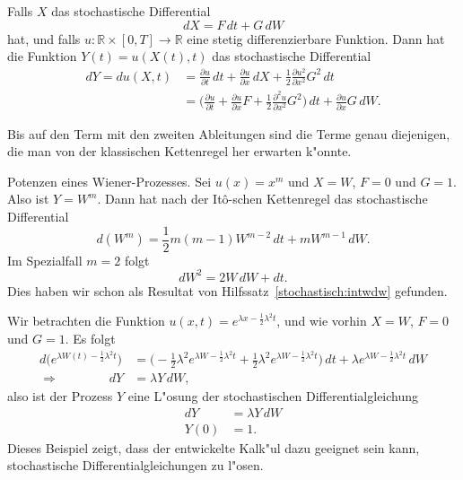\begin{satz}[It\^o's Kettenregel]
Falls $X$ das stochastische Differential
\[
dX=F\,dt + G\,dW
\]
hat, und falls $u\colon \mathbb R\times [0,T]\to\mathbb R$ eine
stetig differenzierbare Funktion.
Dann hat die Funktion $Y(t)=u(X(t), t)$ das stochastische Differential
\begin{align*}
dY
=
du(X,t)
&=\frac{\partial u}{\partial t}\,dt + \frac{\partial u}{\partial x}\,dX 
+\frac12\frac{\partial u^2}{\partial x^2}G^2\,dt
\\
&=
\biggl(
\frac{\partial u}{\partial t}+\frac{\partial u}{\partial x}F
+\frac12\frac{\partial^2u}{\partial x^2}G^2
\biggr)\,dt
+
\frac{\partial u}{\partial x}G\,dW.
\end{align*}
\end{satz}
Bis auf den Term mit den zweiten Ableitungen sind die Terme genau
diejenigen, die man von der klassischen Kettenregel her erwarten
k"onnte.

\begin{beispiel}
Potenzen eines Wiener-Prozesses.
Sei $u(x)=x^m$ und $X=W$, $F=0$ und $G=1$.
Also ist $Y=W^m$.
Dann hat nach der It\^o-schen Kettenregel das stochastische Differential
\[
d(W^m)
=
\frac12m(m-1)W^{m-2}\,dt + mW^{m-1}\,dW.
\]
Im Spezialfall $m=2$ folgt
\[
dW^2 = 2W\,dW + dt.
\]
Dies haben wir schon als Resultat von
Hilfssatz~\ref{stochastisch:intwdw} gefunden.
\end{beispiel}

\begin{beispiel} Wir betrachten die Funktion
$u(x,t)=e^{\lambda x-\frac12\lambda^2 t}$, und wie vorhin $X=W$, $F=0$
und $G=1$.
Es folgt
\begin{align*}
d\biggl(
e^{\lambda W(t)-\frac12\lambda^2 t}
\biggr)
&=
\biggl(
-\frac12\lambda^2 e^{\lambda W-\frac12\lambda^2 t}
+
\frac12\lambda^2 e^{\lambda W-\frac12\lambda^2 t}
\biggr)\,dt
+
\lambda e^{\lambda W -\frac12\lambda^2 t}\,dW
\\
\Rightarrow\qquad\qquad
dY&=\lambda Y\,dW,
\end{align*}
also ist der Prozess $Y$ eine L"osung der stochastischen Differentialgleichung
\begin{align*}
dY&=\lambda Y\,dW
\\
Y(0)&=1.
\end{align*}
Dieses Beispiel zeigt, dass der entwickelte Kalk"ul dazu geeignet sein kann,
stochastische Differentialgleichungen zu l"osen.
\end{beispiel}

